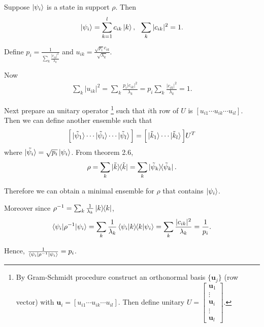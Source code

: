 Suppose $\ket{\psi_i}$ is a state in support $\rho$. Then
\begin{align*}
	\ket{\psi_i} = \sum_{k=1}^l c_{ik} \ket{k}, ~~ \sum_k |c_{ik}|^2 = 1.
\end{align*}

Define $\displaystyle p_i = \frac{1}{\sum_k \frac{|c_{ik}|^2}{\lambda_k} }$ and $\displaystyle u_{ik} = \frac{\sqrt{p_i} c_{ik}}{\sqrt{\lambda_k}}$.

Now
\begin{align*}
	\sum_k |u_{ik}|^2 = \sum_k \frac{p_i | c_{ik} |^2 }{\lambda_k} = p_i \sum_k \frac{| c_{ik} |^2 }{\lambda_k} = 1.
\end{align*}

Next prepare an unitary operator
\footnote{By Gram-Schmidt procedure construct an orthonormal basis $\{\boldsymbol{u}_j\}$ (row vector) with $\boldsymbol{u}_i = [u_{i1} \cdots u_{ik} \cdots u_{il}]$. Then define unitary $U = \begin{bmatrix}
    \boldsymbol{u}_1 \\
    \vdots \\
    \boldsymbol{u}_i \\
    \vdots \\
    \boldsymbol{u}_l
    \end{bmatrix}$.}
such that $i$th row of $U$ is $[u_{i1} \cdots u_{ik} \cdots u_{il}]$.
Then we can define another ensemble such that
\begin{align*}
	\Big[  \ket{\tilde{\psi}_1} \cdots  \ket{\tilde{\psi}_i} \cdots \ket{\tilde{\psi}_l}\Big] = \Big[ \ket{\tilde{k}_1} \cdots \ket{\tilde{k}_l} \Big] U^T
\end{align*}
where $\ket{\tilde{\psi_i}} = \sqrt{p_i} \ket{\psi_i}$.
From theorem 2.6,
\begin{align*}
	\rho = \sum_k \ket{\tilde{k}}\hspace{-1mm} \bra{\tilde{k}} = \sum_k \ket{\tilde{\psi}_k}\hspace{-1mm} \bra{\tilde{\psi}_k}.
\end{align*}

Therefore we can obtain a minimal ensemble for $\rho$ that contains $\ket{\psi_i}$.

Moreover since $\rho^{-1} = \sum_k \frac{1}{\lambda_k} \ket{k}\hspace{-1mm} \bra{k}$,
\begin{align*}
	\braket{\psi_i | \rho^{-1} | \psi_i} = \sum_k \frac{1}{\lambda_k} \braket{\psi_i | k} \hspace{-1mm} \braket{k | \psi_i} = \sum_k \frac{|c_{ik}|^2}{\lambda_k} = \frac{1}{p_i}.
\end{align*}

Hence, $ \frac{1}{\braket{\psi_i | \rho^{-1} | \psi_i}} = p_i $.


